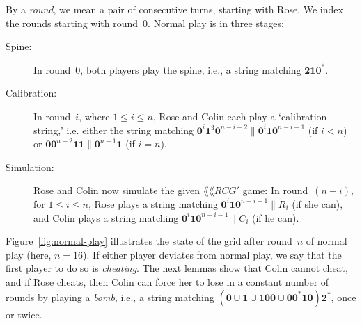 \documentclass{article}
\newcommand{\0}{\mathbf{0}}
\newcommand{\1}{\mathbf{1}}
\newcommand{\2}{\mathbf{2}}
\newcommand{\RCG}{\lang{RCG}}
\theoremstyle{plain}
\theoremstyle{definition}
\begin{document}
By a \emph{round}, we mean a pair of consecutive turns, starting with Rose.  We index the rounds starting with round~$0$.  Normal play is in three stages:
\begin{description}
  \item[Spine:]
        In round~$0$, both players play the spine, i.e., a string matching $\2\1\0^*$.
  \item[Calibration:]
        In round~$i$, where $1\le i\le n$, Rose and Colin each play a `calibration string,' i.e. either the string matching $\0^i\1^3\0^{n-i-2}\|\0^i\1\0^{n-i-1}$ (if $i<n$) or $\0\0^{n-2}\1\1\|\0^{n-1}\1$ (if $i=n$).
  \item[Simulation:] Rose and Colin now simulate the given
        $\lang{\RCG'}$ game: In round~$(n+i)$, for $1\le i\le n$, Rose plays
        a string matching $\0^i\1\0^{n-i-1}\|R_i$ (if she can), and Colin plays a string matching $\0^i\1\0^{n-i-1}\|C_i$ (if he can).
\end{description}

Figure~\ref{fig:normal-play} illustrates the state of the grid after round~$n$ of normal play (here, $n=16$). If either player deviates from normal play, we say that the first player to do so is \emph{cheating}.  The next lemmas show that Colin cannot cheat, and if Rose cheats, then Colin can force her to lose in a constant number of rounds by playing a \emph{bomb}, i.e., a string matching $(\0 \cup \1 \cup \1\0\0\cup \0\0^*\1\0)\2^*$, once or twice.
\end{document}
